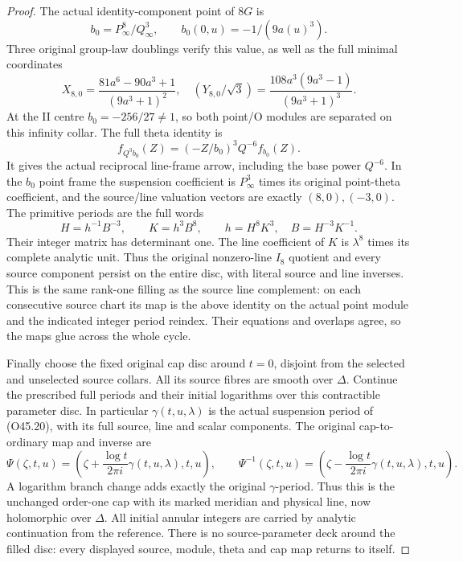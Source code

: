 \begin{proof}
The actual identity-component point of \(8G\) is
\[
 b_0=P_\infty^8/Q_\infty^3,\qquad
 b_0(0,u)=-1/(9a(u)^3).
 \tag{O45.28}
\]
Three original group-law doublings verify this value, as
well as the full minimal coordinates
\[
 X_{8,0}=\frac{81a^6-90a^3+1}{(9a^3+1)^2},\quad
 (Y_{8,0}/\sqrt3)=
 \frac{108a^3(9a^3-1)}{(9a^3+1)^3}.
 \tag{O45.29}
\]
At the II centre \(b_0=-256/27\ne1\), so both point/O
modules are separated on this infinity collar. The full
theta identity is
\[
 f_{Q^3b_0}(Z)=(-Z/b_0)^3Q^{-6}f_{b_0}(Z).
 \tag{O45.30}
\]
It gives the actual reciprocal line-frame arrow, including
the base power \(Q^{-6}\). In the \(b_0\) point frame the
suspension coefficient is \(P_\infty^3\) times its original
point-theta coefficient, and the source/line valuation
vectors are exactly \((8,0),(-3,0)\). The primitive periods
are the full words
\[
 H=h^{-1}B^{-3},\qquad K=h^3B^8,\qquad
 h=H^8K^3,\quad B=H^{-3}K^{-1}.
 \tag{O45.31}
\]
Their integer matrix has determinant one. The line
coefficient of \(K\) is \(\lambda^8\) times its complete
analytic unit. Thus the original nonzero-line \(I_8\)
quotient and every source component persist on the entire
disc, with literal source and line inverses. This is the
same rank-one filling as the source line complement:
on each consecutive source chart its map is the above
identity on the actual point module and the indicated
integer period reindex. Their equations and overlaps
agree, so the maps glue across the whole cycle.

Finally choose the fixed original cap disc around \(t=0\),
disjoint from the selected and unselected source collars.
All its source fibres are smooth over \(\Delta\). Continue
the prescribed full periods and their initial logarithms
over this contractible parameter disc. In particular
\(\gamma(t,u,\lambda)\) is the actual suspension period of
(O45.20), with its full source, line and scalar components.
The original cap-to-ordinary map and inverse are
\[
 \Psi(\zeta,t,u)=
 \left(\zeta+\frac{\log t}{2\pi i}\gamma(t,u,\lambda),t,u\right),
 \qquad
 \Psi^{-1}(\zeta,t,u)=
 \left(\zeta-\frac{\log t}{2\pi i}\gamma(t,u,\lambda),t,u\right).
 \tag{O45.32}
\]
A logarithm branch change adds exactly the original
\(\gamma\)-period. Thus this is the unchanged order-one
cap with its marked meridian and physical line, now
holomorphic over \(\Delta\). All initial annular
integers are carried by analytic continuation from the
reference. There is no source-parameter deck around the
filled disc: every displayed source, module, theta and
cap map returns to itself.


\end{proof}
